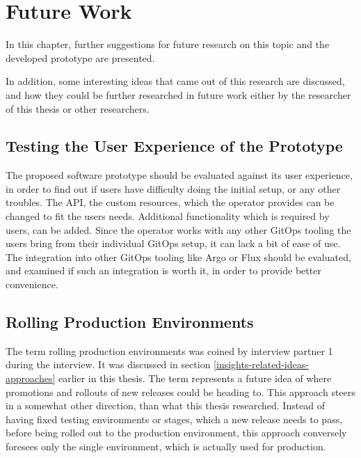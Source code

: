 \chapter{Future Work}
\label{future-work}

In this chapter,
further suggestions for future research on this topic and the developed prototype are presented.

In addition,
some interesting ideas that came out of this research are discussed,
and how they could be further researched in future work either by the researcher of this thesis or other researchers.



\section*{Testing the User Experience of the Prototype}

The proposed software prototype should be evaluated against its user experience,
in order to find out if users have difficulty doing the initial setup,
or any other troubles.
The API, the custom resources, which the operator provides can be changed to fit the users needs.
Additional functionality which is required by users, can be added.
Since the operator works with any other GitOps tooling the users bring from their individual GitOps setup,
it can lack a bit of ease of use. The integration into other GitOps tooling like Argo or Flux
should be evaluated, and examined if such an integration is worth it, in order to provide better convenience.

\section*{Rolling Production Environments}

The term rolling production environments was coined by interview partner 1 during the interview.
It was discussed in section \ref{insights-related-ideas-approaches} earlier in this thesis.
The term represents a future idea of where promotions and rollouts of new releases could be heading to.
This approach steers in a somewhat other direction, than what this thesis researched.
Instead of having fixed testing environments or stages, which a new release needs to pass,
before being rolled out to the production environment,
this approach conversely foresees only the single environment,
which is actually used for production.

